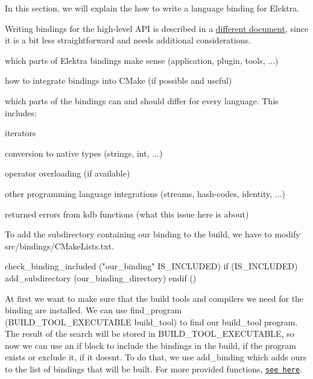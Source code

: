 In this section, we will explain the how to write a language binding for Elektra.

Writing bindings for the high-\/level A\+PI is described in a \hyperlink{doc_tutorials_highlevel-bindings_md}{different document}, since it is a bit less straightforward and needs additional considerations.


\begin{DoxyEnumerate}
\item which parts of Elektra bindings make sense (application, plugin, tools, ...)
\item how to integrate bindings into C\+Make (if possible and useful)
\item which parts of the bindings can and should differ for every language. This includes\+:
\begin{DoxyEnumerate}
\item iterators
\item conversion to native types (strings, int, ...)
\item operator overloading (if available)
\item other programming language integrations (streams, hash-\/codes, identity, ...)
\item returned errors from kdb functions (what this issue here is about)
\end{DoxyEnumerate}
\end{DoxyEnumerate}

To add the subdirectory containing our binding to the build, we have to modify {\ttfamily src/bindings/\+C\+Make\+Lists.\+txt}.


\begin{DoxyCode}
check\_binding\_included ("our\_binding" IS\_INCLUDED)
if (IS\_INCLUDED)
    add\_subdirectory (our\_binding\_directory)
endif ()
\end{DoxyCode}


At first we want to make sure that the build tools and compilers we need for the binding are installed. We can use {\ttfamily find\+\_\+program (B\+U\+I\+L\+D\+\_\+\+T\+O\+O\+L\+\_\+\+E\+X\+E\+C\+U\+T\+A\+B\+LE build\+\_\+tool)} to find our {\ttfamily build\+\_\+tool} program. The result of the search will be stored in {\ttfamily B\+U\+I\+L\+D\+\_\+\+T\+O\+O\+L\+\_\+\+E\+X\+E\+C\+U\+T\+A\+B\+LE}, so now we can use an if block to include the bindings in the build, if the program exists or exclude it, if it doesn\textquotesingle{}t. To do that, we use {\ttfamily add\+\_\+binding} which adds ours to the list of bindings that will be built. For more provided functions, \href{/home/jenkins/workspace/libelektra-release/scripts/cmake/Modules/LibAddBinding.cmake}{\tt see here}.

